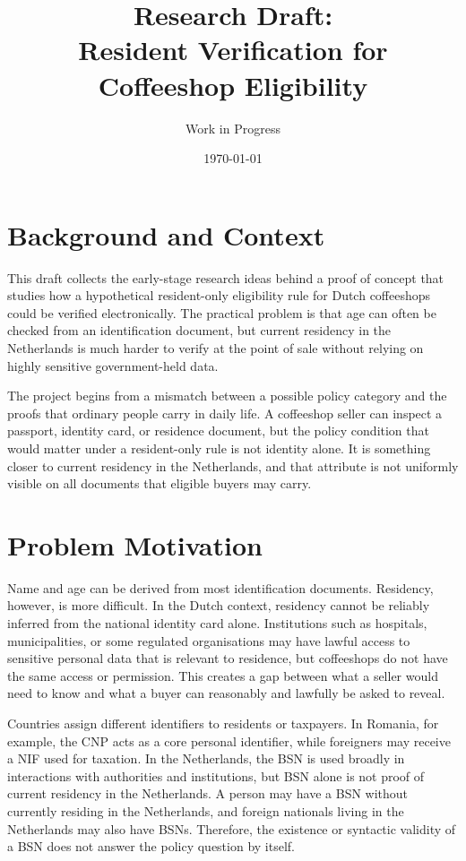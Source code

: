 \documentclass[11pt,a4paper]{article}
\title{Research Draft:\\Resident Verification for Coffeeshop Eligibility}
\author{Work in Progress}
\date{\today}
\begin{document}
\maketitle

\section{Background and Context}

This draft collects the early-stage research ideas behind a proof of concept that studies how a hypothetical resident-only eligibility rule for Dutch coffeeshops could be verified electronically. The practical problem is that age can often be checked from an identification document, but current residency in the Netherlands is much harder to verify at the point of sale without relying on highly sensitive government-held data.

The project begins from a mismatch between a possible policy category and the proofs that ordinary people carry in daily life. A coffeeshop seller can inspect a passport, identity card, or residence document, but the policy condition that would matter under a resident-only rule is not identity alone. It is something closer to current residency in the Netherlands, and that attribute is not uniformly visible on all documents that eligible buyers may carry.

\section{Problem Motivation}

Name and age can be derived from most identification documents. Residency, however, is more difficult. In the Dutch context, residency cannot be reliably inferred from the national identity card alone. Institutions such as hospitals, municipalities, or some regulated organisations may have lawful access to sensitive personal data that is relevant to residence, but coffeeshops do not have the same access or permission. This creates a gap between what a seller would need to know and what a buyer can reasonably and lawfully be asked to reveal.

Countries assign different identifiers to residents or taxpayers. In Romania, for example, the CNP acts as a core personal identifier, while foreigners may receive a NIF used for taxation. In the Netherlands, the BSN is used broadly in interactions with authorities and institutions, but BSN alone is not proof of current residency in the Netherlands. A person may have a BSN without currently residing in the Netherlands, and foreign nationals living in the Netherlands may also have BSNs. Therefore, the existence or syntactic validity of a BSN does not answer the policy question by itself.
\end{document}
